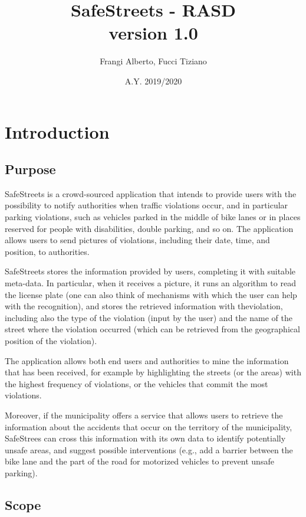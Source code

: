 \documentclass[12pt,a4paper]{report}
\title{SafeStreets - RASD \\ \large version 1.0}
\author{Frangi Alberto, Fucci Tiziano}
\date{A.Y. 2019/2020}
\begin{document}
\maketitle

\setcounter{tocdepth}{1}

\tableofcontents
\chapter{Introduction}
	\section{Purpose}
SafeStreets is a crowd-sourced application that intends to provide users with the possibility to notify authorities when traffic violations occur, and in particular parking violations, such as vehicles parked in the middle of bike lanes or in places reserved for people with disabilities, double parking, and so on. The application allows users to send pictures of violations, including their date, time, and position, to authorities.
 
SafeStreets stores the information provided by users, completing it with suitable meta-data. In particular, when it receives a picture, it runs an algorithm to read the license plate (one can also think of mechanisms with which the user can help with the recognition), and stores the retrieved information with theviolation, including also the type of the violation (input by the user) and the name of the street where the violation occurred (which can be retrieved from the geographical position of the violation). 

The application allows both end users and authorities to mine the information that has been received, for example by highlighting the streets (or the areas) with the highest frequency of violations, or the vehicles that commit the most violations. 

Moreover, if the municipality offers a service that allows users to retrieve the information about the accidents that occur on the territory of the municipality, SafeStrees can cross this information with its own data to identify potentially unsafe areas, and suggest possible interventions (e.g., add a barrier between the bike lane and the part of the road for motorized vehicles to prevent unsafe parking).


	\section{Scope}
\end{document}
